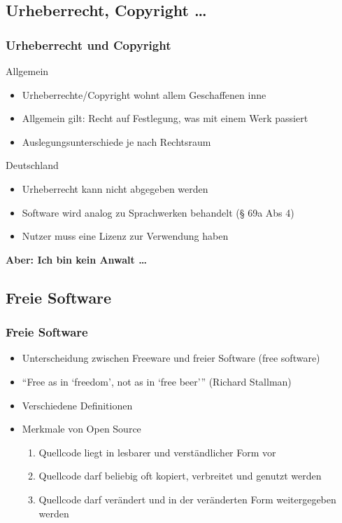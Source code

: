 \documentclass[compress]{beamer}
\begin{document}
\subsection{Urheberrecht, Copyright \dots}
\begin{frame}
	\frametitle{Urheberrecht und Copyright}
	\begin{block}{Allgemein}
		\begin{itemize}
			\item Urheberrechte/Copyright wohnt allem Geschaffenen inne
			\item Allgemein gilt: Recht auf Festlegung, was mit einem Werk 
				passiert
			\item Auslegungsunterschiede je nach Rechtsraum
		\end{itemize}
	\end{block}
	\pause
	\begin{block}{Deutschland}
		\begin{itemize}
			\item Urheberrecht kann nicht abgegeben werden
			\item Software wird analog zu Sprachwerken behandelt (§ 69a Abs 4)
			\item Nutzer muss eine Lizenz zur Verwendung haben
		\end{itemize}
	\end{block}
	\pause
	\textbf{Aber: Ich bin kein Anwalt \dots}
\end{frame}

\subsection{Freie Software}

\begin{frame}
	\frametitle{Freie Software}
	\begin{block}{}
		\begin{itemize}
			\item Unterscheidung zwischen Freeware und freier 
				Software (free software)
			\item “Free as in ‘freedom’, not as in ‘free beer’”
				(Richard Stallman)
			\item Verschiedene Definitionen 
			\item Merkmale von Open Source
			\begin{enumerate}
				\item Quellcode liegt in lesbarer und verständlicher Form vor
				\item Quellcode darf beliebig oft kopiert, verbreitet und 
					genutzt werden
				\item Quellcode darf verändert und in der veränderten Form 
					weitergegeben werden
			\end{enumerate}
		\end{itemize}
	\end{block}
\end{frame}
\end{document}
